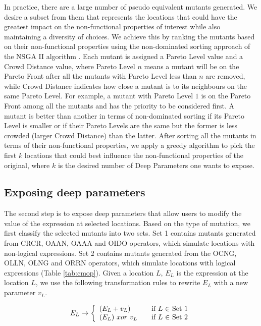 In practice, there are a large number of pseudo equivalent mutants \cite{5477100} generated. We desire a subset from them that represents the locations that could have the greatest impact on the non-functional properties of interest while also maintaining a diversity of choices.  
We achieve this by ranking the mutants based on their non-functional properties using the non-dominated sorting approach of the NSGA II algorithm \cite{996017}. Each mutant is assigned a Pareto Level value and a Crowd Distance value, where Pareto Level $n$ means a mutant will be on the Pareto Front after all the mutants with Pareto Level less than $n$ are removed, while Crowd Distance indicates how close a mutant is to its neighbours on the same Pareto Level. For example, a mutant with Pareto Level $1$ is on the Pareto Front among all the mutants and has the priority to be considered first. A mutant is better than another in terms of non-dominated sorting if its Pareto Level is smaller or if their Pareto Levels are the same but the former is less crowded (larger Crowd Distance) than the latter. After sorting all the mutants in terms of their non-functional properties, we apply a greedy algorithm to pick the first $k$ locations that could best influence the non-functional properties of the original, where $k$ is the desired number of Deep Parameters one wants to expose.

\subsection{Exposing deep parameters}
\label{exposing}
The second step is to expose deep parameters that allow users to modify the value of the expression at selected locations. Based on the type of mutation, we first classify the selected mutants into two sets. Set 1 contains mutants generated from CRCR, OAAN, OAAA and OIDO operators, which simulate locations with non-logical expressions. Set 2 contains mutants generated from the OCNG, OLLN, OLNG and ORRN operators, which simulate locations with logical expressions (Table \ref{tab:cmop}). 
Given a location $L$, $E_L$ is the expression at the location $L$, we use the following transformation rules to rewrite $E_L$ with a new parameter $v_L$.

\begin{equation}
 E_L \rightarrow \left\{
  \begin{array}{l l}
    (E_L + v_L) & \quad \text{if $L$ $\in$ Set 1}\\
    (E_L) \ xor \ v_L & \quad \text{if $L$ $\in$ Set 2}
    \end{array} \right.
\end{equation}

